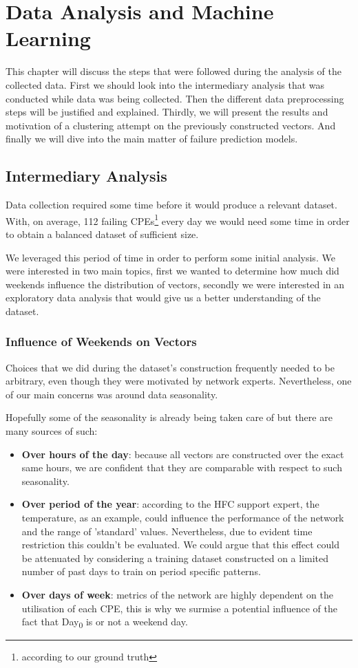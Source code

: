 \chapter{Data Analysis and Machine Learning}
This chapter will discuss the steps that were followed during the analysis of the collected data. First we should look into the intermediary analysis that was conducted while data was being collected. Then the different data preprocessing steps will be justified and explained. Thirdly, we will present the results and motivation of a clustering attempt on the previously constructed vectors. And finally we will dive into the main matter of failure prediction models. 

\section{Intermediary Analysis}
Data collection required some time before it would produce a relevant dataset. With, on average, 112 failing CPEs\footnote{according to our ground truth} every day we would need some time in order to obtain a balanced dataset of sufficient size.

We leveraged this period of time in order to perform some initial analysis. We were interested in two main topics, first we wanted to determine how much did weekends influence the distribution of vectors, secondly we were interested in an exploratory data analysis that would give us a better understanding of the dataset. 

\subsection{Influence of Weekends on Vectors} 
\label{subsec:influence}
Choices that we did during the dataset's construction frequently needed to be arbitrary, even though they were motivated by network experts. Nevertheless, one of our main concerns was around data seasonality. 

Hopefully some of the seasonality is already being taken care of but there are many sources of such:
\begin{itemize}[topsep=0pt]
	\item \textbf{Over hours of the day}: because all vectors are constructed over the exact same hours, we are confident that they are comparable with respect to such seasonality. 
	\item \textbf{Over period of the year}: according to the HFC support expert, the temperature, as an example, could influence the performance of the network and the range of 'standard' values. Nevertheless, due to evident time restriction this couldn't be evaluated. We could argue that this  effect could be attenuated by considering a training dataset constructed on a limited number of past days to train on period specific patterns. 
	\item \textbf{Over days of week}: metrics of the network are highly dependent on the utilisation of each CPE, this is why we surmise a potential influence of the fact that Day\textsubscript{0} is or not a weekend day.
\end{itemize}

